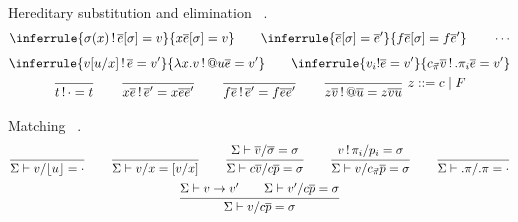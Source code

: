 \documentclass[acmlarge,fleqn]{acmart}\settopmatter{}
\renewcommand{\|}{\mid}
\begin{document}
Hereditary substitution 
and elimination \ .
\begin{gather*}
\inferrule
  {\sigma(x) \bang \overline{e}[\sigma] = v}
  {x \overline{e}[\sigma] = v}
\qquad
\inferrule
  {\overline{e}[\sigma] = \overline{e}'}
  {f \overline{e}[\sigma] = f \overline{e}'}
\qquad
\cdots
\end{gather*}
\begin{gather*}
\inferrule
  { v[u/x] \bang \overline{e} = v'}
  {\lambda x.v \bang @u \overline{e} = v'}
\qquad
\inferrule
  {v_i ! \overline{e} = v'}
  {\cpi \overline{v} \bang .\pi_i \overline{e} = v'}
\\
\ru{}{t \bang \cdot = t}
\qquad
\ru{}{x \overline{e} \bang \overline{e}' = x \overline{e}
  \overline{e}'}
\qquad
\ru{}{f \overline{e} \bang \overline{e}' = f \overline{e} \overline{e}'}
\qquad
\ru{}{z \overline{v} \bang @ \overline{u} = z \overline{v}
  \overline{u}}\ z ::= c \mid F
\end{gather*}



Matching \ .
\begin{gather*}
\ru{}{\Sigma \vdash v/\lfloor u \rfloor = \cdot} %
\qquad
\ru{}{\Sigma \vdash v/x = [v/x]} %
\qquad
\ru
  {\Sigma \vdash \overline{v}/\overline{\sigma} = \sigma}
  {\Sigma \vdash c\overline{v}/c\overline{p} = \sigma}  %
\qquad
\ru{v \bang \pi_i / p_i = \sigma}
{\Sigma \vdash v / \cpi \overline{p} = \sigma} %
\qquad
\ru{}{\Sigma \vdash .\pi/.\pi = \cdot} %
\\
\ru{\Sigma \vdash v \to v' \qquad \Sigma \vdash v'/c\overline{p} = \sigma}
{\Sigma \vdash v / c \overline{p} = \sigma} %
\end{gather*}
\end{document}

